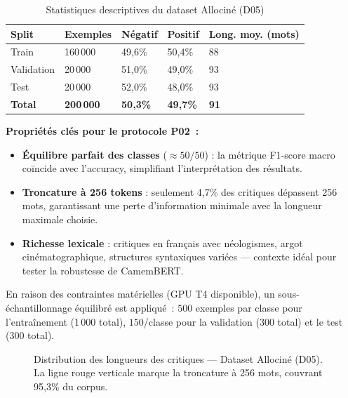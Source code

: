 \documentclass[12pt,a4paper]{article}
\begin{document}
\begin{table}[H]
  \centering
  \caption{Statistiques descriptives du dataset Allociné (D05)}
  \label{tab:dataset_stats}
  \begin{tabularx}{\textwidth}{lXXXX}
    \toprule
    \textbf{Split} & \textbf{Exemples} & \textbf{Négatif} & \textbf{Positif}
    & \textbf{Long. moy. (mots)} \\
    \midrule
    Train       & 160\,000 & 49,6\% & 50,4\% & 88 \\
    Validation  &  20\,000 & 51,0\% & 49,0\% & 93 \\
    Test        &  20\,000 & 52,0\% & 48,0\% & 93 \\
    \midrule
    \textbf{Total} & \textbf{200\,000} & \textbf{50,3\%} & \textbf{49,7\%} & \textbf{91} \\
    \bottomrule
  \end{tabularx}
\end{table}

\textbf{Propriétés clés pour le protocole P02~:}
\begin{itemize}
  \item \textbf{Équilibre parfait des classes} ($\approx 50/50$) : la métrique F1-score
    macro coïncide avec l'accuracy, simplifiant l'interprétation des résultats.
  \item \textbf{Troncature à 256 tokens} : seulement 4,7\% des critiques dépassent
    256 mots, garantissant une perte d'information minimale avec la longueur maximale
    choisie.
  \item \textbf{Richesse lexicale} : critiques en français avec néologismes,
    argot cinématographique, structures syntaxiques variées — contexte idéal pour
    tester la robustesse de CamemBERT.
\end{itemize}

En raison des contraintes matérielles (GPU T4 disponible), un sous-échantillonnage
équilibré est appliqué~: $500$ exemples par classe pour l'entraînement (1\,000 total),
$150$/classe pour la validation (300 total) et le test (300 total).

\begin{figure}[H]
  \centering
  \caption{Distribution des longueurs des critiques — Dataset Allociné (D05).
    La ligne rouge verticale marque la troncature à 256 mots, couvrant 95,3\%
    du corpus.}
  \label{fig:length_distribution}
\end{figure}
\end{document}

